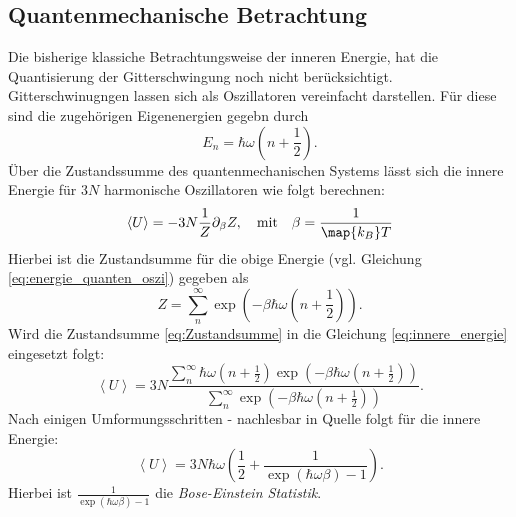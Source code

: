 \subsection{Quantenmechanische Betrachtung}
Die bisherige klassiche Betrachtungsweise der inneren Energie, hat die
Quantisierung der Gitterschwingung noch nicht berücksichtigt.
Gitterschwinugngen lassen sich als Oszillatoren vereinfacht darstellen. Für diese
sind die zugehörigen Eigenenergien gegebn durch
\begin{equation}
  \label{eq:energie_quanten_oszi}
  E_n = \hbar \omega \left(n + \frac{1}{2}\right).
\end{equation}
Über die Zustandssumme des quantenmechanischen Systems lässt sich die innere Energie
für $3N$ harmonische Oszillatoren wie folgt berechnen:
\begin{equation}
  \label{eq:innere_energie}
  \left<U\right> = -3N\frac{1}{Z}\partial_\beta Z, \quad \text{mit} \quad \beta = \frac{1}{\map{k_B}T}
\end{equation}
Hierbei ist die Zustandsumme für die obige Energie (vgl. Gleichung \eqref{eq:energie_quanten_oszi})
gegeben als
\begin{equation}
  \label{eq:Zustandsumme}
  Z = \sum_n^\infty \exp\left(-\beta\hbar\omega\left(n+\frac{1}{2}\right)\right).
\end{equation}
Wird die Zustandsumme \eqref{eq:Zustandsumme} in die Gleichung \eqref{eq:innere_energie}
eingesetzt folgt:
\begin{equation*}
  \left<U\right>= 3N  \frac{ \sum_n^\infty \hbar\omega\left( n+ \frac{1}{2} \right)\exp\left(-\beta\hbar\omega\left( n+\frac{1}{2} \right) \right) }{ \sum_n^\infty \exp\left( -\beta\hbar\omega\left( n+\frac{1}{2} \right) \right)}.
\end{equation*}
Nach einigen Umformungsschritten - nachlesbar in Quelle \cite[S. 220]{marx} folgt für die innere Energie:
\begin{equation}
  \label{eq:innere_Energie_Quantenmechanik_diskrete}
  \left<U\right> = 3N\hbar\omega\left(\frac{1}{2} + \frac{1}{\exp\left(\hbar\omega\beta\right) -1}\right).
\end{equation}
Hierbei ist $\frac{1}{\exp\left(\hbar\omega\beta\right) -1}$ die \emph{Bose-Einstein Statistik}.

